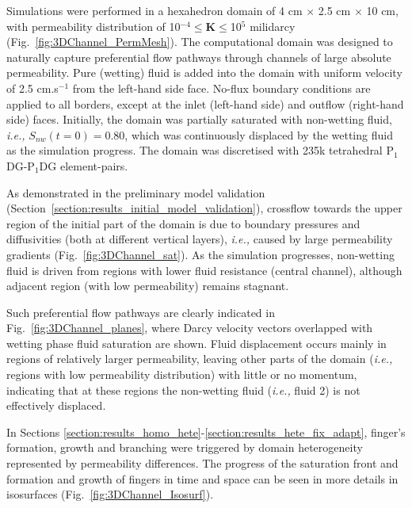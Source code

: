 \documentclass[preprint,authoryear,12pt]{elsarticle}
\newcommand{\PNDG}[2][error]{P$_{#1}$DG-P$_{#2}$DG}
\newcommand{\ie}{{\it i.e., }}
\begin{document}

\medskip
Simulations were performed in a hexahedron domain of 4 cm $\times$ 2.5 cm $\times$ 10 cm, with permeability distribution of 10$^{-4}\le\mathbf{K}\le$10$^{5}$  milidarcy (Fig.~\ref{fig:3DChannel_PermMesh}). The computational domain was designed to naturally capture preferential flow pathways through channels of large absolute permeability. Pure (wetting) fluid is added into the domain with uniform velocity of 2.5 cm.s$^{-1}$ from the left-hand side face. No-flux boundary conditions are applied to all borders, except at the inlet (left-hand side) and outflow (right-hand side) faces. Initially, the domain was partially saturated with non-wetting fluid, \ie $S_{nw}(t=0)=0.80$, which was continuously displaced by the wetting fluid as the simulation progress. The domain was discretised with 235k tetrahedral \PNDG[1]{1} element-pairs.

\medskip
As demonstrated in the preliminary model validation (Section~\ref{section:results_initial_model_validation}), crossflow towards the upper region of the initial part of the domain is due to boundary pressures and diffusivities (both at different vertical layers), \ie caused by large permeability gradients (Fig.~\ref{fig:3DChannel_sat}). As the simulation progresses, non-wetting fluid is driven from regions with lower fluid resistance (central channel), although adjacent region (with low permeability) remains stagnant.

\medskip
Such preferential flow pathways are clearly indicated in Fig.~\ref{fig:3DChannel_planes}, where Darcy velocity vectors overlapped with wetting phase fluid saturation are shown. Fluid displacement occurs mainly in regions of relatively larger permeability, leaving other parts of the domain (\ie regions with low permeability distribution) with little or no momentum, indicating that at these regions the non-wetting fluid (\ie fluid 2) is not effectively displaced. 

\medskip
In Sections \ref{section:results_homo_hete}-\ref{section:results_hete_fix_adapt}, finger's formation, growth and branching were triggered by domain heterogeneity represented by permeability differences. The progress of the saturation front and formation and growth of fingers in time and space can be seen in more details in isosurfaces (Fig.~\ref{fig:3DChannel_Isosurf}).
\end{document}
